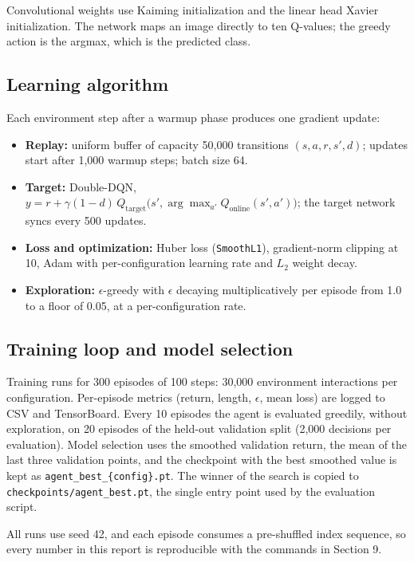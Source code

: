 \documentclass[11pt,a4paper]{article}
\begin{document}
Convolutional weights use Kaiming initialization and the linear head Xavier initialization. The network maps an image directly to ten Q-values; the greedy action is the argmax, which is the predicted class.

\subsection{Learning algorithm}

Each environment step after a warmup phase produces one gradient update:

\begin{itemize}
\item \textbf{Replay:} uniform buffer of capacity 50{,}000 transitions $(s, a, r, s', d)$; updates start after 1{,}000 warmup steps; batch size 64.
\item \textbf{Target:} Double-DQN, $y = r + \gamma (1-d)\, Q_{\text{target}}\big(s', \arg\max_{a'} Q_{\text{online}}(s', a')\big)$; the target network syncs every 500 updates.
\item \textbf{Loss and optimization:} Huber loss (\texttt{SmoothL1}), gradient-norm clipping at 10, Adam with per-configuration learning rate and $L_2$ weight decay.
\item \textbf{Exploration:} $\epsilon$-greedy with $\epsilon$ decaying multiplicatively per episode from 1.0 to a floor of 0.05, at a per-configuration rate.
\end{itemize}

\subsection{Training loop and model selection}

Training runs for 300 episodes of 100 steps: 30{,}000 environment interactions per configuration. Per-episode metrics (return, length, $\epsilon$, mean loss) are logged to CSV and TensorBoard. Every 10 episodes the agent is evaluated greedily, without exploration, on 20 episodes of the held-out validation split (2{,}000 decisions per evaluation). Model selection uses the smoothed validation return, the mean of the last three validation points, and the checkpoint with the best smoothed value is kept as \texttt{agent\_best\_\{config\}.pt}. The winner of the search is copied to \texttt{checkpoints/agent\_best.pt}, the single entry point used by the evaluation script.

All runs use seed 42, and each episode consumes a pre-shuffled index sequence, so every number in this report is reproducible with the commands in Section 9.
\end{document}
